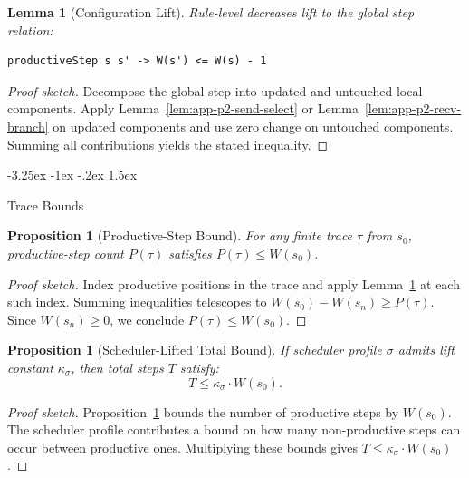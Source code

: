 \documentclass[a4paper,10pt,twocolumn,english]{article}
\makeatletter
\renewcommand{\subsection}{\@startsection{subsection}{2}{\z@}%
  {-3.25ex \@plus -1ex \@minus -.2ex}%
  {1.5ex}%
  {\raggedright\normalfont\normalsize\bfseries}}
\numberwithin{equation}{section}
\theoremstyle{paperdef}
\theoremstyle{paperplain}
\newtheorem{lemma}[definition]{Lemma}
\newtheorem{proposition}[definition]{Proposition}
\theoremstyle{paperdef}
\theoremstyle{paperremark}
\makeatother
\begin{document}
\begin{lemma}[Configuration Lift]
	\label{lem:app-p2-config-lift}
	Rule-level decreases lift to the global step relation:

	\noindent\begin{minipage}{\columnwidth}
		\begin{lstlisting}
productiveStep s s' -> W(s') <= W(s) - 1
\end{lstlisting}
	\end{minipage}
\end{lemma}

\begin{proof}[Proof sketch]
	Decompose the global step into updated and untouched local components. Apply Lemma~\ref{lem:app-p2-send-select} or Lemma~\ref{lem:app-p2-recv-branch} on updated components and use zero change on untouched components. Summing all contributions yields the stated inequality.
\end{proof}

\subsection{Trace Bounds}

\begin{proposition}[Productive-Step Bound]
	\label{prop:app-p2-productive-bound}
	For any finite trace $\tau$ from $s_0$, productive-step count $P(\tau)$ satisfies $P(\tau) \le W(s_0)$.
\end{proposition}

\begin{proof}[Proof sketch]
	Index productive positions in the trace and apply Lemma~\ref{lem:app-p2-config-lift} at each such index. Summing inequalities telescopes to $W(s_0) - W(s_n) \ge P(\tau)$. Since $W(s_n) \ge 0$, we conclude $P(\tau) \le W(s_0)$.
\end{proof}

\begin{proposition}[Scheduler-Lifted Total Bound]
	\label{prop:app-p2-scheduler-bound}
	If scheduler profile $\sigma$ admits lift constant $\kappa_\sigma$, then total steps $T$ satisfy:
	\begin{equation}
		T \le \kappa_\sigma \cdot W(s_0).
	\end{equation}
\end{proposition}

\begin{proof}[Proof sketch]
	Proposition~\ref{prop:app-p2-productive-bound} bounds the number of productive steps by $W(s_0)$. The scheduler profile contributes a bound on how many non-productive steps can occur between productive ones. Multiplying these bounds gives $T \le \kappa_\sigma \cdot W(s_0)$.
\end{proof}
\end{document}
